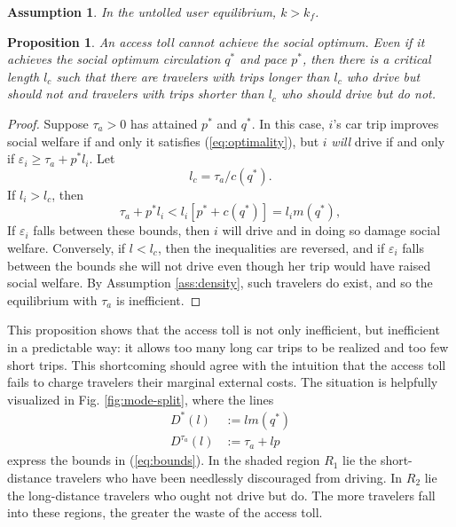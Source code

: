 \documentclass[preprint,authoryear]{elsarticle}
\newcommand{\taua}{\tau_a}
\newcommand{\ve}{\varepsilon}
\newtheorem{proposition}{Proposition}
\newtheorem{assumption}{Assumption}
\begin{document}
\begin{assumption}\label{ass:kf}
	In the untolled user equilibrium, $k>k_f$.
\end{assumption}

\begin{proposition}
	An access toll cannot achieve the social optimum. Even if it achieves the social optimum circulation $q^*$ and pace $p^*$, then there is a critical length $l_c$ such that there are travelers with trips longer than $l_c$ who drive but should not and travelers with trips shorter than $l_c$ who should drive but do not. 
\end{proposition}

\begin{proof}

	Suppose $\taua>0$ has attained $p^*$ and $q^*$. In this case, $i$'s car trip improves social welfare if and only it satisfies (\ref{eq:optimality}), but $i$ \emph{will} drive if and only if $\ve_i\geq\taua+p^* l_i$. Let 
	\begin{equation}
		l_c=\taua/c(q^*).	
    \end{equation}
	If $l_i>l_c$, then 
	\begin{equation}\label{eq:bounds}
		\taua + p^*l_i < l_i[p^*+c(q^*)] = l_i m(q^*),
	\end{equation}
	If $\ve_i$ falls between these bounds, then $i$ will drive and in doing so damage social welfare. Conversely, if $l<l_c$, then the inequalities are reversed, and if $\ve_i$ falls between the  bounds she will not drive even though her trip would have raised social welfare. By Assumption \ref{ass:density}, such travelers do exist, and so the equilibrium with $\taua$ is inefficient.

\end{proof}

This proposition shows that the access toll is not only inefficient, but inefficient in a predictable way: it allows too many long car trips to be realized and too few short trips. This shortcoming should agree with the intuition that the access toll fails to charge travelers their marginal external costs. The situation is helpfully visualized in Fig. \ref{fig:mode-split}, where the lines
\begin{align}
D^*(l) &:=  l m(q^*)\\
D^{\taua}(l) &:= \taua + l p
\end{align}
express the bounds in (\ref{eq:bounds}). In the shaded region $R_1$ lie the short-distance travelers who have been needlessly discouraged from driving. In $R_2$ lie the long-distance travelers who ought not drive but do. The more travelers fall into these regions, the greater the waste of the access toll.
\end{document}
